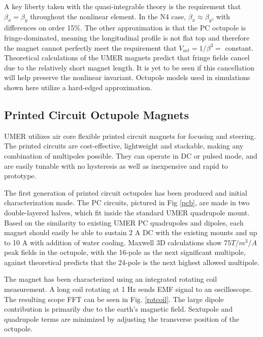 A key liberty taken with the quasi-integrable theory is the requirement that $\beta_x=\beta_y$ throughout the nonlinear element. In the N4 case, $\beta_x \approx \beta_y$, with differences on order 15\%. The other approximation is that the PC octupole is fringe-dominated, meaning the longitudinal profile is not flat top and therefore the magnet cannot perfectly meet the requirement that $V_{oct} = 1/\beta^3 =$ constant. Theoretical calculations of the UMER magnets predict that fringe fields cancel due to the relatively short magnet length.\cite{venturini} It is yet to be seen if this cancellation will help preserve the nonlinear invariant. Octupole models used in simulations shown here utilize a hard-edged approximation. 




\subsection{Printed Circuit Octupole Magnets}

UMER utilizes air core flexible printed circuit magnets for focusing and steering. The printed circuits are cost-effective, lightweight and stackable, making any combination of multipoles possible. They can operate in DC or pulsed mode, and are easily tunable with no hysteresis as well as inexpensive and rapid to prototype.

The first generation of printed circuit octupoles has been produced and initial characterization made. The PC circuits, pictured in Fig \ref{pcb}, are made in two double-layered halves, which fit inside the standard UMER quadrupole mount. Based on the similarity to existing UMER PC quadrupoles and dipoles, each magnet should easily be able to sustain 2 A DC with the existing mounts and up to 10 A with addition of water cooling. Maxwell 3D calculations show $75 T/m^3/A$ peak fields in the octupole, with the 16-pole as the next significant multipole, against theoretical predicts that the 24-pole is the next highest allowed multipole. \cite{venturini}

The magnet has been characterized using an integrated rotating coil measurement. A long coil rotating at 1 Hz sends EMF signal to an oscilloscope. The resulting scope FFT can be seen in Fig. \ref{rotcoil}. The large dipole contribution is primarily due to the earth’s magnetic field. Sextupole and quadrupole terms are minimized by adjusting the transverse position of the octupole.

